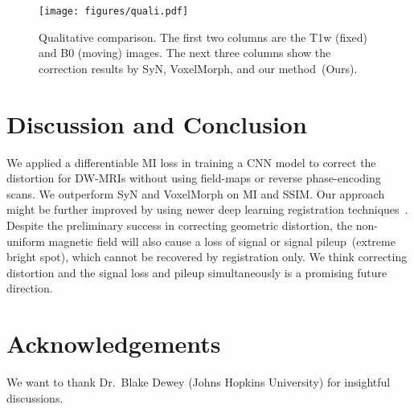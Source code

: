 \documentclass[]{spie}  %
\begin{document}
	
	 \begin{figure}[!tb]

	 		\centering
	 		\texttt{[image: figures/quali.pdf]}
	 		\caption{Qualitative comparison. The first two columns are the T1w (fixed) and B0 (moving) images. The next three columns show the correction results by SyN, VoxelMorph, and our method~(Ours).}%
	 		\label{fig:T1-b0}

	 	\end{figure}
 	
\section{Discussion and Conclusion}  
%
We applied a differentiable MI loss in training a CNN model to correct the distortion for DW-MRIs without using field-maps or reverse phase-encoding scans. We outperform SyN and VoxelMorph on MI and SSIM. Our approach might be further improved by using newer deep learning registration techniques~\cite{liu2022mmmi}. Despite the preliminary success in correcting geometric distortion, the non-uniform magnetic field will also cause a loss of signal or signal pileup~(extreme bright spot), which cannot be recovered by registration only. We think correcting distortion and the signal loss and pileup simultaneously is a promising future direction.



\section*{Acknowledgements}
We want to thank Dr.~Blake Dewey (Johns Hopkins University) for insightful discussions.

\small
\end{document}
